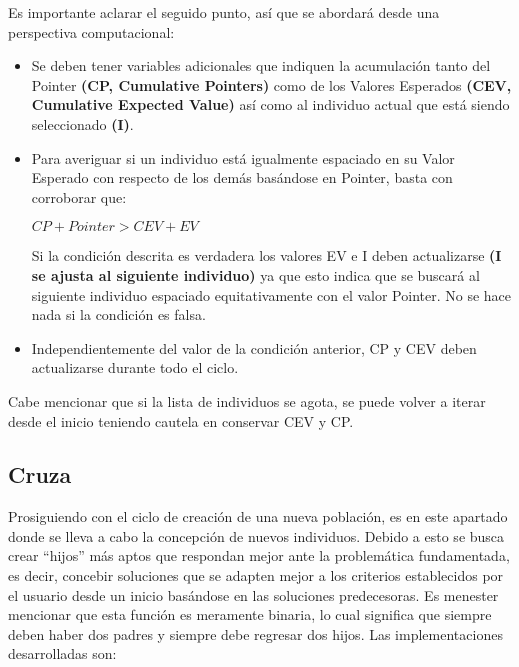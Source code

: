 \documentclass[class=report, crop=false]{standalone}
\begin{document}
Es importante aclarar el seguido punto, así que se abordará desde 
una perspectiva computacional:

\begin{itemize}
\item Se deben tener variables adicionales que indiquen la 
acumulación tanto del Pointer \textbf{(CP, Cumulative Pointers)} 
como de los Valores Esperados \textbf{(CEV, Cumulative Expected Value)} 
así como al individuo actual que está siendo seleccionado \textbf{(I)}.
\item Para averiguar si un individuo está igualmente espaciado en 
su Valor Esperado con respecto de los demás basándose en Pointer, 
basta con corroborar que:\medskip\break
\centerline{$CP + Pointer > CEV + EV$}\medskip\break
Si la condición descrita es verdadera los valores EV e I deben 
actualizarse \textbf{(I se ajusta al siguiente individuo)} ya 
que esto indica que se buscará al siguiente individuo espaciado 
equitativamente con el valor Pointer. No se hace nada si la 
condición es falsa.
\item Independientemente del valor de la condición anterior, CP 
y CEV deben actualizarse durante todo el ciclo.
\end{itemize}
Cabe mencionar que si la lista de individuos se agota, se puede 
volver a iterar desde el inicio teniendo cautela en conservar CEV 
y CP.

\subsection{Cruza}
\label{sec:c2_5}
Prosiguiendo con el ciclo de creación de una nueva población, 
es en este apartado donde se lleva a cabo la concepción de nuevos 
individuos.\break
Debido a esto se busca crear ``hijos'' más aptos que respondan 
mejor ante la problemática fundamentada, es decir, concebir 
soluciones que se adapten mejor a los criterios establecidos 
por el usuario desde un inicio basándose en las soluciones 
predecesoras.\break
Es menester mencionar que esta función es meramente binaria, 
lo cual significa que siempre deben haber dos padres y siempre 
debe regresar dos hijos.\medskip\break
Las implementaciones desarrolladas son:

\end{document}

